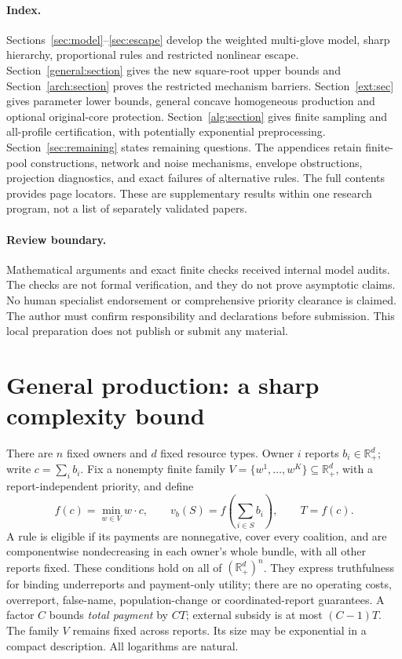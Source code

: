 \documentclass[11pt]{article}
\theoremstyle{definition}\newtheorem{definition}[theorem]{Definition}
\theoremstyle{remark}\newtheorem{remark}[theorem]{Remark}
\newcommand{\R}{\mathbb R}
\begin{document}
\paragraph{Index.}
Sections~\ref{sec:model}--\ref{sec:escape} develop the weighted multi-glove
model, sharp hierarchy, proportional rules and restricted nonlinear escape.
Section~\ref{general:section} gives the new square-root upper bounds and
Section~\ref{arch:section} proves the restricted mechanism barriers.
Section~\ref{ext:sec} gives parameter lower bounds, general
concave homogeneous production and optional original-core protection.
Section~\ref{alg:section} gives finite sampling and all-profile certification,
with potentially exponential preprocessing. Section~\ref{sec:remaining}
states remaining questions. The appendices retain finite-pool constructions,
network and noise mechanisms, envelope obstructions, projection diagnostics,
and exact failures of alternative rules. The full contents provides page
locators. These are supplementary results within one research program,
not a list of separately validated papers.

\paragraph{Review boundary.}
Mathematical arguments and exact finite checks received internal model audits.
The checks are not formal verification, and they do not prove asymptotic
claims. No human specialist endorsement or comprehensive priority clearance
is claimed. The author must confirm responsibility and declarations before
submission. This local preparation does not publish or submit any material.
\tableofcontents
\clearpage
\section{General production: a sharp complexity bound}\label{prod:section}
There are $n$ fixed owners and $d$ fixed resource types. Owner $i$ reports
$b_i\in\R_+^d$; write $c=\sum_i b_i$. Fix a nonempty finite family
$V=\{w^1,\ldots,w^K\}\subseteq\R_+^d$, with a report-independent priority,
and define
\[
 f(c)=\min_{w\in V}w\cdot c,\qquad
 v_b(S)=f\left(\sum_{i\in S}b_i\right),\qquad T=f(c).
\]
A rule is eligible if its payments are nonnegative, cover every coalition,
and are componentwise nondecreasing in each owner's whole bundle, with all
other reports fixed. These conditions hold on all of $(\R_+^d)^n$.
They express truthfulness for binding underreports and payment-only utility;
there are no operating costs, overreport, false-name, population-change or
coordinated-report guarantees. A factor $C$ bounds \emph{total payment} by
$CT$; external subsidy is at most $(C-1)T$. The family $V$ remains fixed
across reports. Its size may be exponential in a compact description. All logarithms are natural.
\end{document}
